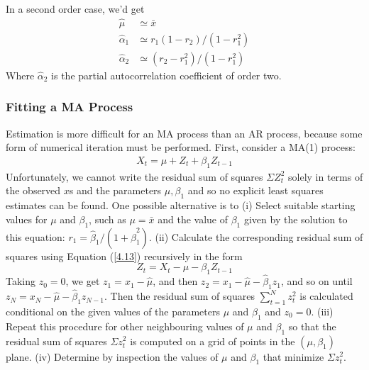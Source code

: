 In a second order case, we'd get \begin{align*}
    \hat{\mu} &\simeq \bar{x}\\
    \hat{\alpha}_1 &\simeq r_1(1-r_2)/(1-r_1^2) \\
    \hat{\alpha}_2 &\simeq (r_2-r_1^2)/(1-r_1^2)
\end{align*} Where $\hat{\alpha}_2$ is the partial autocorrelation coefficient of order two. 

\subsubsection{Fitting a MA Process}
Estimation is more difficult for an MA process than an AR process, because some form of numerical iteration must be performed. First, consider a MA(1) process: \begin{align}
X_t = \mu + Z_t + \beta_1 Z_{t-1} \label{4.13}
\end{align}
Unfortunately, we cannot write the residual sum of squares $\Sigma Z_t^2$ solely in terms of the observed $x$s and the parameters $\mu, \beta_1$ and so no explicit least squares estimates can be found. One possible alternative is to (i) Select suitable starting values for $\mu$ and $\beta_1$, such as $\mu=\bar{x}$ and the value of $\beta_1$ given by the solution to this equation: $r_1 = \hat{\beta}_1/ (1+\hat{\beta}_1^2)$. (ii) Calculate the corresponding residual sum of squares using Equation (\ref{4.13}) recursively in the form \[ Z_t = X_t -\mu -\beta_1 Z_{t-1}\] Taking $z_0 = 0$, we get $z_1 = x_1 -\hat{\mu}$, and then $z_2 = x_1 -\hat{\mu}-\hat{\beta}_1 z_1$, and so on until $z_N = x_N- \hat{\mu}- \hat{\beta}_1 z_{N-1}$. Then the residual sum of squares $\sum_{t=1}^N z_t^2$ is calculated conditional on the given values of the parameters $\mu$ and $\beta_1$ and $z_0=0$. (iii) Repeat this procedure for other neighbouring values of $\mu$ and $\beta_1$ so that the residual sum of squares $\Sigma z_t^2$ is computed on a grid of points in the $(\mu,\beta_1)$ plane. (iv) Determine by inspection the values of $\mu$ and $\beta_1$ that minimize $\Sigma z_t^2$.


